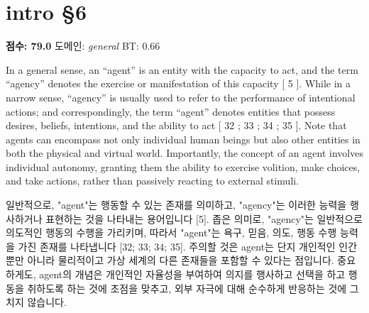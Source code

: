 \documentclass[11pt,a4paper,oneside]{memoir}
\begin{document}
\section{intro §6}
\noindent \textbf{\color{ScoreGreen}점수: 79.0} \quad 도메인: \textit{general}  \quad \textcolor{ScoreGreen}{BT: 0.66}
\vspace{0.4em}

\begin{tcolorbox}[origstyle]
\small In a general sense, an “agent” is an entity with the capacity to act, and the term “agency” denotes the exercise or manifestation of this capacity [ 5 ]. While in a narrow sense, “agency” is usually used to refer to the performance of intentional actions; and correspondingly, the term “agent” denotes entities that possess desires, beliefs, intentions, and the ability to act [ 32 ; 33 ; 34 ; 35 ]. Note that agents can encompass not only individual human beings but also other entities in both the physical and virtual world. Importantly, the concept of an agent involves individual autonomy, granting them the ability to exercise volition, make choices, and take actions, rather than passively reacting to external stimuli.
\end{tcolorbox}
\vspace{0.3em}

\begin{tcolorbox}[kostyle]
일반적으로, "agent"는 행동할 수 있는 존재를 의미하고, "agency"는 이러한 능력을 행사하거나 표현하는 것을 나타내는 용어입니다 [5]. 좁은 의미로, "agency"는 일반적으로 의도적인 행동의 수행을 가리키며, 따라서 "agent"는 욕구, 믿음, 의도, 행동 수행 능력을 가진 존재를 나타냅니다 [32; 33; 34; 35]. 주의할 것은 agent는 단지 개인적인 인간뿐만 아니라 물리적이고 가상 세계의 다른 존재들을 포함할 수 있다는 점입니다. 중요하게도, agent의 개념은 개인적인 자율성을 부여하여 의지를 행사하고 선택을 하고 행동을 취하도록 하는 것에 초점을 맞추고, 외부 자극에 대해 순수하게 반응하는 것에 그치지 않습니다.
\end{tcolorbox}
\vspace{0.8em}
\end{document}
